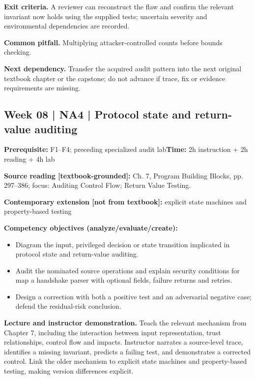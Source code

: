 \documentclass[10pt,letterpaper]{article}
\begin{document}
\textbf{Exit criteria.} A reviewer can reconstruct the flaw and confirm the relevant invariant now holds using the supplied tests; uncertain severity and environmental dependencies are recorded.

\textbf{Common pitfall.} Multiplying attacker-controlled counts before bounds checking.

\textbf{Next dependency.} Transfer the acquired audit pattern into the next original textbook chapter or the capstone; do not advance if trace, fix or evidence requirements are missing.

\subsection{Week 08 | NA4 | Protocol state and return-value auditing}
\textbf{Prerequisite:} F1--F4; preceding specialized audit lab\hfill\textbf{Time:} 2h instruction + 2h reading + 4h lab

\textbf{Source reading [textbook-grounded]:} Ch. 7, Program Building Blocks, pp. 297--386; focus: Auditing Control Flow; Return Value Testing.

\textbf{Contemporary extension [not from textbook]:} explicit state machines and property-based testing

\textbf{Competency objectives (analyze/evaluate/create):}
\begin{itemize}[leftmargin=*,itemsep=2pt]
\item Diagram the input, privileged decision or state transition implicated in protocol state and return-value auditing.
\item Audit the nominated source operations and explain security conditions for map a handshake parser with optional fields, failure returns and retries.
\item Design a correction with both a positive test and an adversarial negative case; defend the residual-risk conclusion.
\end{itemize}
\textbf{Lecture and instructor demonstration.} Teach the relevant mechanism from Chapter 7, including the interaction between input representation, trust relationships, control flow and impacts. Instructor narrates a source-level trace, identifies a missing invariant, predicts a failing test, and demonstrates a corrected control. Link the older mechanism to explicit state machines and property-based testing, making version differences explicit.
\end{document}
